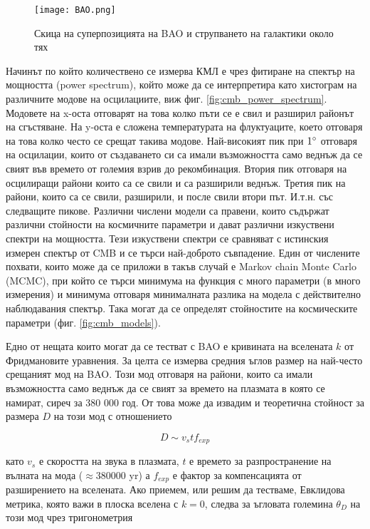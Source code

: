 \documentclass[a4paper,12pt]{article}
\begin{document}
\begin{figure}[h!] %
\centering
\texttt{[image: BAO.png]}
\caption{Скица на суперпозицията на BAO и струпването на галактики около тях}
\label{fig:BAO}
\end{figure}

Начинът по който количествено се измерва КМЛ е чрез фитиране на спектър на мощността (power spectrum), който може да се интерпретира като хистограм на различните модове на осцилациите, виж фиг. \ref{fig:cmb_power_spectrum}. Модовете на x-оста отговарят на това колко пъти се е свил и разширил районът на сгъстяване. На y-оста е сложена температурата на флуктуаците, което отговаря на това колко често се срещат такива модове. Най-високият пик при $1 \degree$ отговаря на осцилации, които от създаването си са имали възможността само веднъж да се свият във времето от големия взрив до рекомбинация. Втория пик отговаря на осцилиращи райони които са се свили и са разширили веднъж. Третия пик на райони, които са се свили, разширили, и после свили втори път. И.т.н. със следващите пикове. Различни числени модели са правени, които съдържат различни стойности на космичните параметри и дават различни изкуствени спектри на мощността. Тези изкуствени спектри се сравняват с истинския измерен спектър от CMB и се търси най-доброто съвпадение. Един от числените похвати, които може да се приложи в такъв случай е Markov chain Monte Carlo (MCMC), при който се търси минимума на функция с много параметри (в много измерения) и минимума отговаря минималната разлика на модела с действително наблюдавания спектър. Така могат да се определят стойностите на космическите параметри (фиг. \ref{fig:cmb_models}).

Едно от нещата които могат да се тестват с BAO е кривината на вселената $k$ от Фридмановите уравнения. За целта се измерва средния ъглов размер на най-често срещаният мод на BAO. Този мод отговаря на райони, които са имали възможността само веднъж да се свият за времето на плазмата в която се намират, сиреч за 380 000 год. От това може да извадим и теоретична стойност за размера $D$ на този мод с отношението

\begin{equation}
    D \sim  v_s t f_{exp}
\label{eq:BAO1}
\end{equation}

като $v_s$ е скоростта на звука в плазмата, $t$ е времето за разпространение на вълната на мода ($\approx 380000$ yr) а $f_{exp}$ е фактор за компенсацията от разширението на вселената. Ако приемем, или решим да тестваме, Евклидова метрика, която важи в плоска вселена с $k=0$, следва за ъгловата големина $\theta_D$ на този мод чрез тригонометрия
\end{document}
